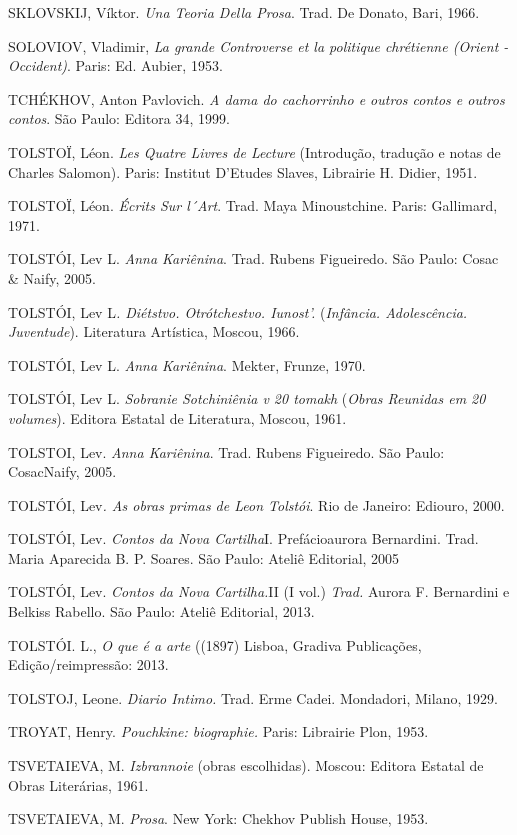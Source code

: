 {{{SKLOVSKIJ, Víktor. \emph{Una Teoria Della Prosa}. Trad. De Donato,
Bari, 1966.

SOLOVIOV, Vladimir, \emph{La grande Controverse et la politique
chrétienne (Orient -Occident)}. Paris: Ed. Aubier, 1953.

TCHÉKHOV, Anton Pavlovich. \emph{A dama do cachorrinho e outros contos e
outros contos}. São Paulo: Editora 34, 1999.

TOLSTOÏ, Léon. \emph{Les Quatre Livres de Lecture} (Introdução,
tradução e notas de Charles Salomon). Paris: Institut D'Etudes Slaves,
Librairie H. Didier, 1951.

TOLSTOÏ, Léon. \emph{Écrits Sur l´Art}. Trad. Maya Minoustchine. Paris:
Gallimard, 1971.

TOLSTÓI, Lev L. \emph{Anna Kariênina}. Trad. Rubens Figueiredo. São
Paulo: Cosac \& Naify, 2005.

TOLSTÓI, Lev L\emph{. Diétstvo. Otrótchestvo.
Iunost'.} (\emph{Infância. Adolescência. Juventude}). Literatura
Artística, Moscou, 1966.

TOLSTÓI, Lev L. \emph{Anna Kariênina}. Mekter, Frunze, 1970.

TOLSTÓI, Lev L. \emph{Sobranie Sotchiniênia v 20 tomakh} (\emph{Obras
Reunidas em 20 volumes}). Editora Estatal de Literatura, Moscou, 1961.

TOLSTOI, Lev. \emph{Anna Kariênina}. Trad. Rubens Figueiredo. São
Paulo: CosacNaify, 2005.

TOLSTÓI, Lev\emph{. As obras primas de Leon Tolstói}. Rio de Janeiro:
Ediouro, 2000.

TOLSTÓI, Lev. \emph{Contos da Nova Cartilha}I. Prefácioaurora
Bernardini. Trad. Maria Aparecida B. P. Soares. São Paulo: Ateliê
Editorial, 2005

TOLSTÓI, Lev. \emph{Contos da Nova Cartilha.}II (I vol.) \emph{Trad.}
Aurora F. Bernardini e Belkiss Rabello. São Paulo: Ateliê Editorial,
2013.

TOLSTÓI. L., \emph{O que é a arte} ((1897) Lisboa, Gradiva Publicações,
Edição/reimpressão: 2013.

TOLSTOJ, Leone. \emph{Diario Intimo.} Trad. Erme Cadei. Mondadori,
Milano, 1929.

TROYAT, Henry. \emph{Pouchkine: biographie.} Paris: Librairie Plon,
1953.

TSVETAIEVA, M. \emph{Izbrannoie} (obras escolhidas). Moscou: Editora
Estatal de Obras Literárias, 1961.

TSVETAIEVA, M. \emph{Prosa}. New York: Chekhov Publish House, 1953.

}}}
